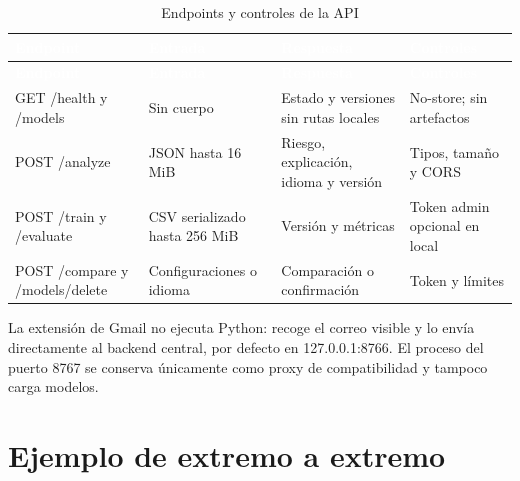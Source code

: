 \documentclass[11pt,a4paper]{article}
\begin{document}
\begingroup
  \small
  \begin{xltabular}{\textwidth}{|>{\raggedright\arraybackslash}p{2.45cm}|X|X|X|}
  \caption{Endpoints y controles de la API}\label{tab:comparativa-3}\\
    \hline
    \textcolor{white}{\textbf{Endpoint}} & \textcolor{white}{\textbf{Entrada}} & \textcolor{white}{\textbf{Respuesta}} & \textcolor{white}{\textbf{Controles}} \\
    \hline
    \endfirsthead
    \hline
    \textcolor{white}{\textbf{Endpoint}} & \textcolor{white}{\textbf{Entrada}} & \textcolor{white}{\textbf{Respuesta}} & \textcolor{white}{\textbf{Controles}} \\
    \hline
    \endhead
    GET /\allowbreak{}health y /\allowbreak{}models & Sin cuerpo & Estado y versiones sin rutas locales & No-store; sin artefactos \\
    \hline
    POST /\allowbreak{}analyze & JSON hasta 16 MiB & Riesgo, explicación, idioma y versión & Tipos, tamaño y CORS \\
    \hline
    POST /\allowbreak{}train y /\allowbreak{}evaluate & CSV serializado hasta 256 MiB & Versión y métricas & Token admin opcional en local \\
    \hline
    POST /\allowbreak{}compare y /\allowbreak{}models/\allowbreak{}delete & Configuraciones o idioma & Comparación o confirmación & Token y límites \\
    \hline
  \end{xltabular}
\endgroup

La extensión de Gmail no ejecuta Python: recoge el correo visible y lo envía directamente al backend central, por defecto en 127.0.0.1:8766. El proceso del puerto 8767 se conserva únicamente como proxy de compatibilidad y tampoco carga modelos.

\section{Ejemplo de extremo a extremo}
\end{document}
